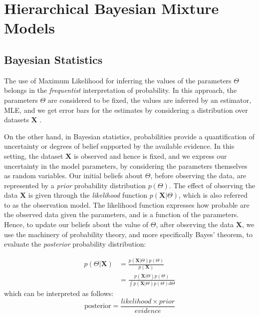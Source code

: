 \section{Hierarchical Bayesian Mixture Models} \label{fdmm-s}

\subsection{Bayesian Statistics}
The use of Maximum Likelihood for inferring the values of the parameters $\Theta$ belongs in the \emph{frequentist} interpretation of probability. In this approach, the parameters $\Theta$ are considered to be fixed, the values are inferred by an estimator, \eg MLE, and we get error bars for the estimates by considering a distribution over datasets $\mathbf{X}$ \cite[Ch. 1]{Bishop2006}. 

On the other hand, in Bayesian statistics, probabilities provide a quantification of uncertainty or degrees of belief supported by the available evidence. In this setting, the dataset $\mathbf{X}$ is observed and hence is fixed, and we express our uncertainty in the model parameters, by considering the parameters themselves as random variables. Our initial beliefs about $\Theta$, before observing the data, are represented by a \emph{prior} probability distribution $p(\Theta)$. The effect of observing the data $\mathbf{X}$ is given through the \emph{likelihood} function $p(\mathbf{X}|\Theta)$, which is also referred to as the observation model.  The likelihood function expresses how probable are the observed data given the parameters, and is a function of the parameters. Hence, to update our beliefs about the value of $\Theta$, after observing the data $\mathbf{X}$, we use the machinery of probability theory, and more specifically Bayes' theorem, to evaluate the \emph{posterior} probability distribution:

\begin{equation}
  \begin{aligned}
	p(\Theta | \mathbf{X}) & = \frac{p(\mathbf{X}|\Theta) p(\Theta)}{p(\mathbf{X})} \\
	& = \frac{p(\mathbf{X}|\Theta) p(\Theta)}{\int p(\mathbf{X}|\Theta) p(\Theta) d\Theta}
  \end{aligned}
\end{equation}
which can be interpreted as follows:
\begin{equation}
	\text{posterior} = \frac{likelihood \times prior}{evidence}
\end{equation}

